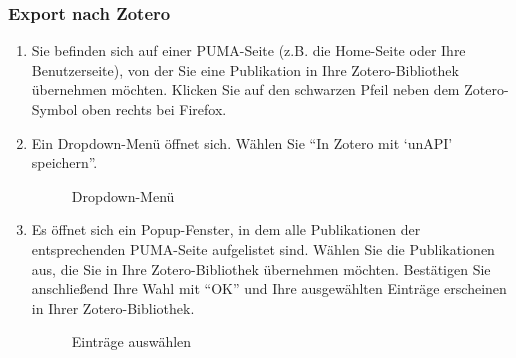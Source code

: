 \subsubsection*{Export nach Zotero}\label{sss:exportZotero}
\begin{enumerate}
    \item Sie befinden sich auf einer PUMA-Seite (z.B. die Home-Seite oder Ihre Benutzerseite), von der Sie eine Publikation in Ihre Zotero-Bibliothek übernehmen möchten. Klicken Sie auf den schwarzen Pfeil neben dem Zotero-Symbol oben rechts bei Firefox.
    \item Ein Dropdown-Menü öffnet sich. Wählen Sie \enquote{In Zotero mit \enquote{unAPI} speichern}.
    
\begin{figure}[h!]
 \centering
 \caption{Dropdown-Menü}
 \label{fig:dropdownMenue}
\end{figure}

    \item Es öffnet sich ein Popup-Fenster, in dem alle Publikationen der entsprechenden PUMA-Seite aufgelistet sind. Wählen Sie die Publikationen aus, die Sie in Ihre Zotero-Bibliothek übernehmen möchten. Bestätigen Sie anschließend Ihre Wahl mit \enquote{OK} und Ihre ausgewählten Einträge erscheinen in Ihrer Zotero-Bibliothek.

\begin{figure}[h!]
 \centering
 \caption{Einträge auswählen}
 \label{fig:eintraegeAuswaehlen}
\end{figure}

\end{enumerate} 
